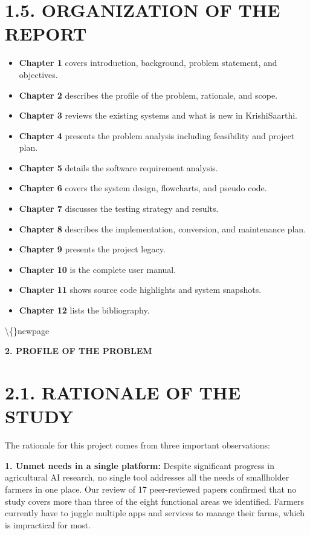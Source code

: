 \documentclass[12pt, a4paper]{report}
\begin{document}
\section{1.5. ORGANIZATION OF THE REPORT}
\begin{itemize}[leftmargin=*]
  \item \textbf{Chapter 1} covers introduction, background, problem statement, and objectives.
  \item \textbf{Chapter 2} describes the profile of the problem, rationale, and scope.
  \item \textbf{Chapter 3} reviews the existing systems and what is new in KrishiSaarthi.
  \item \textbf{Chapter 4} presents the problem analysis including feasibility and project plan.
  \item \textbf{Chapter 5} details the software requirement analysis.
  \item \textbf{Chapter 6} covers the system design, flowcharts, and pseudo code.
  \item \textbf{Chapter 7} discusses the testing strategy and results.
  \item \textbf{Chapter 8} describes the implementation, conversion, and maintenance plan.
  \item \textbf{Chapter 9} presents the project legacy.
  \item \textbf{Chapter 10} is the complete user manual.
  \item \textbf{Chapter 11} shows source code highlights and system snapshots.
  \item \textbf{Chapter 12} lists the bibliography.
\end{itemize}
\textbackslash\{\}newpage

\begin{center}
{\fontsize{14}{17}\bfseries 2. PROFILE OF THE PROBLEM}\\
\end{center}
\section{2.1. RATIONALE OF THE STUDY}
The rationale for this project comes from three important observations:

\textbf{1. Unmet needs in a single platform:} Despite significant progress in agricultural AI research, no single tool addresses all the needs of smallholder farmers in one place. Our review of 17 peer-reviewed papers confirmed that no study covers more than three of the eight functional areas we identified. Farmers currently have to juggle multiple apps and services to manage their farms, which is impractical for most.
\end{document}
